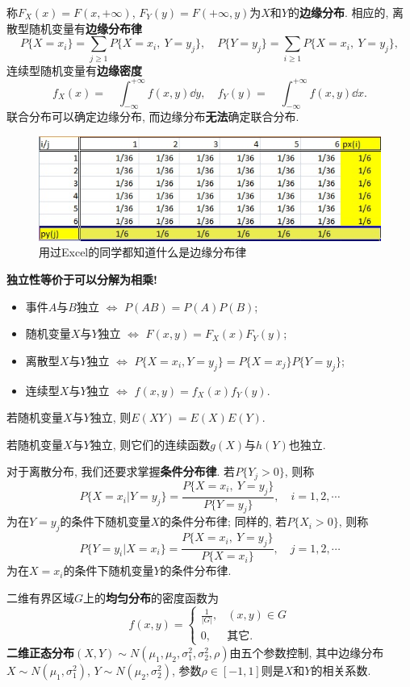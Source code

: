 \documentclass[11pt]{ctexart}
\begin{document}
称$F_X(x) = F(x, +\infty)$, $F_Y(y) = F(+\infty, y)$为$X$和$Y$的\textbf{边缘分布}. 
相应的, 离散型随机变量有\textbf{边缘分布律}
$$
P\{X=x_{i}\}=\sum_{j\geq1}P\{X=x_{i},\:Y=y_{j}\},\quad P\{Y=y_{j}\}=\sum_{i\geq1}P\{X=x_{i},\:Y=y_{j}\}, 
$$
连续型随机变量有\textbf{边缘密度}
$$
f_X(x)=\quad\int_{-\infty}^{+\infty}f(x,y) \dd y,\quad f_{Y}(y)=\quad\int_{-\infty}^{+\infty}f(x,y) \dd x. 
$$
联合分布可以确定边缘分布, 而边缘分布\textbf{无法}确定联合分布. 

\begin{figure}[H]
	\centering
	\includegraphics[width = .8\textwidth]{figure/marginal-distributions-1.jpg}
	\caption{用过Excel的同学都知道什么是边缘分布律}
\end{figure}

\noindent
\textbf{独立性等价于可以分解为相乘!}
\begin{itemize}
	\item 事件$A$与$B$独立 \;$\Longleftrightarrow$\; $P(AB) = P(A) P(B)$; 
	\item 随机变量$X$与$Y$独立 \;$\Longleftrightarrow$\; $F(x,y) = F_X(x)F_Y(y)$; 
	\item 离散型$X$与$Y$独立 \;$\Longleftrightarrow$\; $P\{X = x_i, Y = y_j\} = P\{X = x_j\} P\{Y = y_j\}$; 
	\item 连续型$X$与$Y$独立 \;$\Longleftrightarrow$\; $f(x, y) = f_X(x) f_Y(y)$. 
\end{itemize}
\begin{corollary}
	若随机变量$X$与$Y$独立, 则$E(XY) = E(X) E(Y)$.
\end{corollary}
\begin{corollary}
	若随机变量$X$与$Y$独立, 则它们的连续函数$g(X)$与$h(Y)$也独立. 
\end{corollary}

对于离散分布, 我们还要求掌握\textbf{条件分布律}. 
若$P\{Y_j > 0\}$, 则称
$$
P\{X=x_i|Y=y_j\}=\frac{P\{X=x_i,\:Y=y_j\}}{P\{Y=y_j\}},\quad i=1,2,\cdots 
$$
为在$Y=y_j$的条件下随机变量$X$的条件分布律; 同样的, 若$P\{X_i > 0\}$, 则称
$$
P\{Y=y_i|X=x_i\}=\frac{P\{X=x_i,\:Y=y_j\}}{P\{X=x_i\}},\quad j=1,2,\cdots 
$$
为在$X=x_i$的条件下随机变量$Y$的条件分布律. 

二维有界区域$G$上的\textbf{均匀分布}的密度函数为
\begin{equation*}
	f(x, y) = 
		\begin{cases}
			\frac{1}{|G|}, &(x, y) \in G \\ 0, & \text{其它}. 
		\end{cases}
\end{equation*}
\textbf{二维正态分布}$(X,Y) \sim N(\mu_1, \mu_2, \sigma_1^2, \sigma_2^2, \rho)$由五个参数控制, 其中边缘分布$X \sim N(\mu_1, \sigma_1^2)$, $Y \sim N(\mu_2, \sigma_2^2)$, 参数$\rho \in [ -1, 1]$则是$X$和$Y$的相关系数. 
\end{document}
